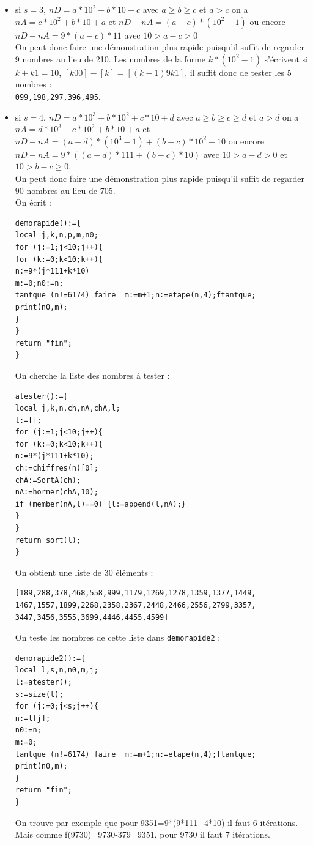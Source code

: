 \documentclass[a4paper,11pt]{book}
\begin{document}
\begin{itemize}
\item si $s=3$, $nD=a*10^2+b*10+c$ avec $a\geq b\geq c$ et 
$a>c$ on a $nA=c*10^2+b*10+a$ et
$nD-nA=(a-c)*(10^2-1)$ ou encore
$nD-nA=9*(a-c)*11$ avec $10>a-c>0$\\
On peut donc faire une d\'emonstration plus rapide puisqu'il suffit de 
regarder 9 nombres au lieu de 210. Les nombres de la forme $k*(10^2-1)$ 
s'\'ecrivent si $k+k1=10$, $[k00]-[k]=[(k-1)9k1]$, il suffit donc de tester
les 5 nombres :\\
{\tt 099,198,297,396,495}.

\item si $s=4$, $nD=a*10^3+b*10^2+c*10+d$ avec $a\geq b\geq c\geq d$ et 
$a>d$ on a $nA=d*10^3+c*10^2+b*10+a$ et
$nD-nA=(a-d)*(10^3-1)+(b-c)*10^2-10$ ou encore
$nD-nA=9*((a-d)*111+(b-c)*10)$ avec $10>a-d>0$ et $10>b-c \geq 0$.\\
On peut donc faire une d\'emonstration plus rapide puisqu'il suffit de 
regarder 90 nombres au lieu de 705.\\
On \'ecrit :\\
\begin{verbatim}
demorapide():={
local j,k,n,p,m,n0;
for (j:=1;j<10;j++){
for (k:=0;k<10;k++){
n:=9*(j*111+k*10)
m:=0;n0:=n;
tantque (n!=6174) faire  m:=m+1;n:=etape(n,4);ftantque;
print(n0,m);
}
}
return "fin";
}

\end{verbatim}
On cherche la liste des nombres \`a tester :
\begin{verbatim}
atester():={
local j,k,n,ch,nA,chA,l;
l:=[];
for (j:=1;j<10;j++){
for (k:=0;k<10;k++){
n:=9*(j*111+k*10);
ch:=chiffres(n)[0];
chA:=SortA(ch);
nA:=horner(chA,10);
if (member(nA,l)==0) {l:=append(l,nA);}
}
}
return sort(l);
}
\end{verbatim}
On obtient une liste de 30 \'el\'ements  :
\begin{verbatim}
[189,288,378,468,558,999,1179,1269,1278,1359,1377,1449,
1467,1557,1899,2268,2358,2367,2448,2466,2556,2799,3357,
3447,3456,3555,3699,4446,4455,4599]
\end{verbatim}
On teste les nombres de cette liste dans {\tt demorapide2} :
\begin{verbatim}
demorapide2():={
local l,s,n,n0,m,j;
l:=atester();
s:=size(l);
for (j:=0;j<s;j++){
n:=l[j];
n0:=n;
m:=0;
tantque (n!=6174) faire  m:=m+1;n:=etape(n,4);ftantque;
print(n0,m);
}
return "fin";
}
\end{verbatim}
On trouve par exemple que pour 9351=9*(9*111+4*10) il faut 6 it\'erations. 
Mais comme f(9730)=9730-379=9351, pour 9730 il faut 7 it\'erations. 
\end{itemize}
\end{document}
